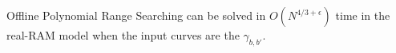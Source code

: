 \begin{lemma}[%
    label={lem:batch}%
]
Offline Polynomial Range Searching can be solved in
$O(N^{4/3+\epsilon})$ time in the real-RAM model when the input
curves are the $\gamma_{b,b'}$.
\end{lemma}

